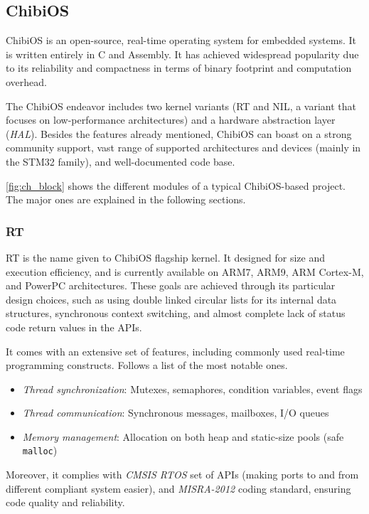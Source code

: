 \subsection{ChibiOS}
ChibiOS is an open-source, real-time operating system for embedded systems.
It is written entirely in C and Assembly.
It has achieved widespread popularity due to its reliability and compactness in terms of binary footprint and computation overhead.

The ChibiOS endeavor includes two kernel variants (RT and NIL, a variant that focuses on low-performance architectures) and a hardware abstraction layer (\emph{HAL}).
Besides the features already mentioned, ChibiOS can boast on a strong community support, vast range of supported architectures and devices (mainly in the STM32 family), and well-documented code base.

\autoref{fig:ch_block} shows the different modules of a typical ChibiOS-based project.
The major ones are explained in the following sections.



\subsubsection{RT}
RT is the name given to ChibiOS flagship kernel.
It designed for size and execution efficiency, and is currently available on ARM7, ARM9, ARM Cortex-M, and PowerPC architectures.
These goals are achieved through its particular design choices, such as using double linked circular lists for its internal data structures, synchronous context switching, and almost complete lack of status code return values in the APIs.

It comes with an extensive set of features, including commonly used real-time programming constructs.
Follows a list of the most notable ones.
\begin{itemize}
    \item \emph{Thread synchronization}: Mutexes, semaphores, condition variables, event flags
    \item \emph{Thread communication}: Synchronous messages, mailboxes, I/O queues
    \item \emph{Memory management}: Allocation on both heap and static-size pools (safe \texttt{malloc})
\end{itemize}

Moreover, it complies with \emph{CMSIS RTOS} set of APIs (making ports to and from different compliant system easier), and \emph{MISRA-2012} coding standard, ensuring code quality and reliability.

